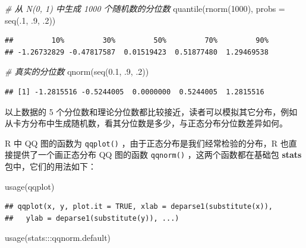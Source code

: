 \documentclass[
  b5paper,
  UTF8,twoside]{book}
\newenvironment{Shaded}{\begin{snugshade}}{\end{snugshade}}
\newcommand{\AttributeTok}[1]{\textcolor[rgb]{0.77,0.63,0.00}{#1}}
\newcommand{\CommentTok}[1]{\textcolor[rgb]{0.56,0.35,0.01}{\textit{#1}}}
\newcommand{\DecValTok}[1]{\textcolor[rgb]{0.00,0.00,0.81}{#1}}
\newcommand{\FloatTok}[1]{\textcolor[rgb]{0.00,0.00,0.81}{#1}}
\newcommand{\FunctionTok}[1]{\textcolor[rgb]{0.00,0.00,0.00}{#1}}
\newcommand{\NormalTok}[1]{#1}
\newcommand{\SpecialCharTok}[1]{\textcolor[rgb]{0.00,0.00,0.00}{#1}}
\begin{document}
\begin{Shaded}
\begin{Highlighting}[]
\CommentTok{\# 从 N(0, 1) 中生成 1000 个随机数的分位数}
\FunctionTok{quantile}\NormalTok{(}\FunctionTok{rnorm}\NormalTok{(}\DecValTok{1000}\NormalTok{), }\AttributeTok{probs =} \FunctionTok{seq}\NormalTok{(.}\DecValTok{1}\NormalTok{, .}\DecValTok{9}\NormalTok{, .}\DecValTok{2}\NormalTok{))}
\end{Highlighting}
\end{Shaded}

\begin{verbatim}
##         10%         30%         50%         70%         90% 
## -1.26732829 -0.47817587  0.01519423  0.51877480  1.29469538
\end{verbatim}

\begin{Shaded}
\begin{Highlighting}[]
\CommentTok{\# 真实的分位数}
\FunctionTok{qnorm}\NormalTok{(}\FunctionTok{seq}\NormalTok{(}\FloatTok{0.1}\NormalTok{, .}\DecValTok{9}\NormalTok{, .}\DecValTok{2}\NormalTok{))}
\end{Highlighting}
\end{Shaded}

\begin{verbatim}
## [1] -1.2815516 -0.5244005  0.0000000  0.5244005  1.2815516
\end{verbatim}

以上数据的 5 个分位数和理论分位数都比较接近，读者可以模拟其它分布，例如从卡方分布中生成随机数，看其分位数是多少，与正态分布分位数差异如何。

R 中 QQ 图的函数为 \texttt{qqplot()} ，由于正态分布是我们经常检验的分布，R 也直接提供了一个画正态分布 QQ 图的函数 \texttt{qqnorm()} ，这两个函数都在基础包 \textbf{stats} 包中，它们的用法如下：

\begin{Shaded}
\begin{Highlighting}[]
\FunctionTok{usage}\NormalTok{(qqplot)}
\end{Highlighting}
\end{Shaded}

\begin{verbatim}
## qqplot(x, y, plot.it = TRUE, xlab = deparse1(substitute(x)),
##   ylab = deparse1(substitute(y)), ...)
\end{verbatim}

\begin{Shaded}
\begin{Highlighting}[]
\FunctionTok{usage}\NormalTok{(stats}\SpecialCharTok{:::}\NormalTok{qqnorm.default)}
\end{Highlighting}
\end{Shaded}
\end{document}
